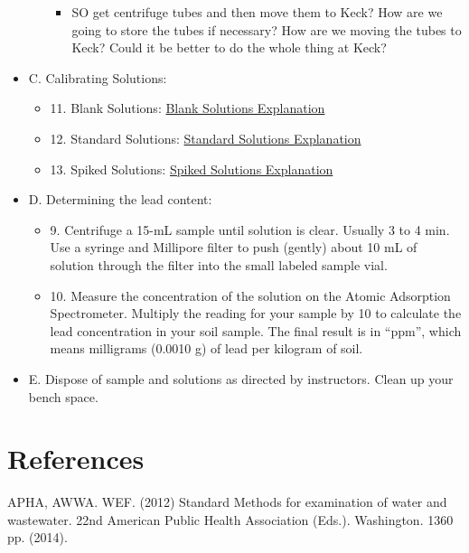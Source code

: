 \documentclass[12pt]{../SOP2}
\begin{document}
\begin{itemize}
\begin{itemize}
    \begin{itemize}
      \item SO get centrifuge tubes and then move them to Keck?
  How are we going to store the tubes if necessary?
  How are we moving the tubes to Keck?
  Could it be better to do the whole thing at Keck?
    \end{itemize}  
  \end{itemize}
  \item C. Calibrating Solutions:
  \begin{itemize}
    \item 11. Blank Solutions: \href{https://en.wikipedia.org/wiki/Blank_(solution)}{Blank Solutions Explanation}
    \item 12. Standard Solutions: \href{https://en.wikipedia.org/wiki/Standard_solution}{Standard Solutions Explanation}
    \item 13. Spiked Solutions: \href{}{Spiked Solutions Explanation}
  \end{itemize}  
  \item D. Determining the lead content:
  \begin{itemize}
    \item 9.   Centrifuge a 15-mL sample until solution is clear. Usually 3 to 4 min. Use a syringe and Millipore filter to push (gently) about 10 mL of solution through the filter into the small labeled sample vial.
    \item 10. Measure the concentration of the solution on the Atomic Adsorption Spectrometer.  Multiply the reading for your sample by 10 to calculate the lead concentration in your soil sample.  The final result is in “ppm”, which means milligrams (0.0010 g) of lead per kilogram of soil.
  \end{itemize}
  \item E. Dispose of sample and solutions as directed by instructors. Clean up your bench space.
\end{itemize}


\section{References}

\NP APHA, AWWA. WEF. (2012) Standard Methods for examination of water and wastewater. 22nd American Public Health Association (Eds.). Washington. 1360 pp. (2014).
\end{document}
